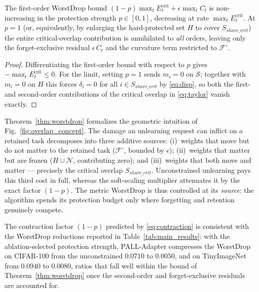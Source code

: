 \begin{corollary}
\label{cor:monotone}
The first-order WorstDrop bound
$(1-p)\max_t E^{\mathrm{crit}}_t+\epsilon\max_t C_t$ is non-increasing
in the protection strength $p\in[0,1]$, decreasing at rate
$\max_t E^{\mathrm{crit}}_t$. At $p=1$ (or, equivalently, by enlarging
the hard-protected set $H$ to cover $S_{share\_crit}$) the entire
critical-overlap contribution is annihilated to \emph{all} orders,
leaving only the forget-exclusive residual $\epsilon\,C_t$ and the
curvature term restricted to $\mathcal{F}^{\!\circ}$.
\end{corollary}

\begin{proof}
Differentiating the first-order bound with respect to $p$ gives
$-\max_t E^{\mathrm{crit}}_t\le 0$. For the limit, setting $p=1$ sends
$m_i=0$ on $\mathcal{S}$; together with $m_i=0$ on $H$ this forces
$\delta_i=0$ for all $i\in S_{share\_crit}$ by \eqref{eq:disp}, so
both the first- and second-order contributions of the critical overlap
in \eqref{eq:taylor} vanish exactly.
\end{proof}

\begin{remark}[Interpretation]
\label{rem:interpretation}
Theorem~\ref{thm:worstdrop} formalizes the geometric intuition of
Fig.~\ref{fig:overlap_concept}. The damage an unlearning request can
inflict on a retained task decomposes into three additive sources:
(i)~weights that move but do not matter to the retained task
($\mathcal{F}^{\!\circ}$, bounded by $\epsilon$); (ii)~weights that
matter but are frozen ($H\cup\mathcal{N}$, contributing zero); and
(iii)~weights that both move and matter --- precisely the critical
overlap $S_{share\_crit}$. Unconstrained unlearning pays this third
cost in full, whereas the soft-scaling multiplier attenuates it by the
exact factor $(1-p)$. The metric WorstDrop is thus controlled at its
\emph{source}: the algorithm spends its protection budget only where
forgetting and retention genuinely compete.
\end{remark}

\begin{remark}
\label{rem:empirical}
The contraction factor $(1-p)$ predicted by \eqref{eq:contraction} is
consistent with the WorstDrop reductions reported in
Table~\ref{tab:main_results}: with the ablation-selected protection
strength, PALL-Adapter compresses the WorstDrop on CIFAR-100 from the
unconstrained $0.0710$ to $0.0050$, and on TinyImageNet from $0.0940$
to $0.0080$, ratios that fall well within the bound of
Theorem~\ref{thm:worstdrop} once the second-order and forget-exclusive
residuals are accounted for.
\end{remark}
